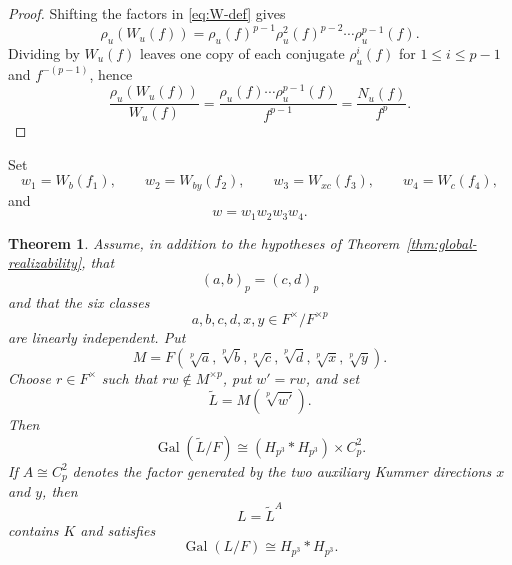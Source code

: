 \documentclass[12pt]{amsart}
\newtheorem{theorem}{Theorem}[section]
\theoremstyle{definition}
\theoremstyle{remark}
\DeclareMathOperator{\Gal}{Gal}
\newcommand{\Hp}{H_{p^3}}
\begin{document}
\begin{proof}
Shifting the factors in \eqref{eq:W-def} gives
\[
 \rho_u(W_u(f))
 =\rho_u(f)^{p-1}\rho_u^2(f)^{p-2}\cdots\rho_u^{p-1}(f).
\]
Dividing by $W_u(f)$ leaves one copy of each conjugate $\rho_u^i(f)$ for
$1\le i\le p-1$ and $f^{-(p-1)}$, hence
\[
 \frac{\rho_u(W_u(f))}{W_u(f)}
 =\frac{\rho_u(f)\cdots\rho_u^{p-1}(f)}{f^{p-1}}
 =\frac{N_u(f)}{f^p}.
\]
\end{proof}

Set
\[
 w_1=W_b(f_1),\qquad
 w_2=W_{by}(f_2),\qquad
 w_3=W_{xc}(f_3),\qquad
 w_4=W_c(f_4),
\]
and
\[
 w=w_1w_2w_3w_4.
\]

\begin{theorem}\label{thm:explicit}
Assume, in addition to the hypotheses of
Theorem~\ref{thm:global-realizability}, that
\[
 (a,b)_p=(c,d)_p
\]
and that the six classes
\[
 a,b,c,d,x,y\in F^\times/F^{\times p}
\]
are linearly independent. Put
\[
 M=F(\sqrt[p]{a},\sqrt[p]{b},\sqrt[p]{c},\sqrt[p]{d},
   \sqrt[p]{x},\sqrt[p]{y}).
\]
Choose $r\in F^\times$ such that $rw\notin M^{\times p}$, put $w'=rw$,
and set
\[
 \widetilde L=M(\sqrt[p]{w'}).
\]
Then
\[
 \Gal(\widetilde L/F)\cong(\Hp*\Hp)\times C_p^2.
\]
If $A\cong C_p^2$ denotes the factor generated by the two auxiliary Kummer
directions $x$ and $y$, then
\[
 L=\widetilde L^A
\]
contains $K$ and satisfies
\[
 \Gal(L/F)\cong\Hp*\Hp.
\]
\end{theorem}
\end{document}
